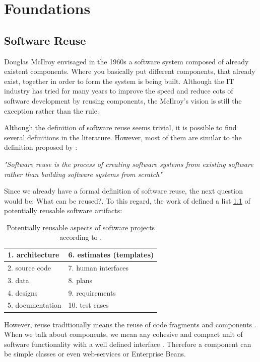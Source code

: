 \chapter{Foundations}

\section{Software Reuse}
\label{chap:sw-reuse}
Douglas McIlroy \citep{McIlroy1968} envisaged in the 1960s a software system composed of already existent components. Where you basically put different components, that already exist, together in order to form the system is being built. Although the IT industry has tried for many years to improve the speed and reduce cots of software development by reusing components, the McIlroy's vision is still the exception rather than the rule.

Although the definition of software reuse seems trivial, it is possible to find several definitions in the literature. However, most of them are similar to the definition proposed by \cite{Krueger1992}:

\textit{"Software reuse is the process of creating software systems from existing software rather than building software systems from scratch"}

Since we already have a formal definition of software reuse, the next question would be: What can be reused?. To this regard, the work of \cite{Frakes1996} defined a list \ref{reusable-list} of potentially reusable software artifacts:

\begin{table}[]
\centering
\label{reusable-list}
	\begin{tabular}{|l|l|}
		\hline
		1. architecture						 & 6. estimates (templates) \\ \hline
		2. source code  						 & 7. human interfaces      \\ \hline
		3. data                               & 8. plans                 \\ \hline
		4. designs                            & 9. requirements          \\ \hline
		5. documentation                      & 10. test cases           \\ \hline
	\end{tabular}
	\caption{Potentially reusable aspects of software projects according to \cite{Frakes1996}.}
\end{table}

However, reuse traditionally means the reuse of code fragments and components \cite{Mili2002}. When we talk about components, we mean any cohesive and compact unit of software functionality with a well defined interface \citep{Hummel2008}. Therefore a component can be simple classes or even web-services or Enterprise Beans.

